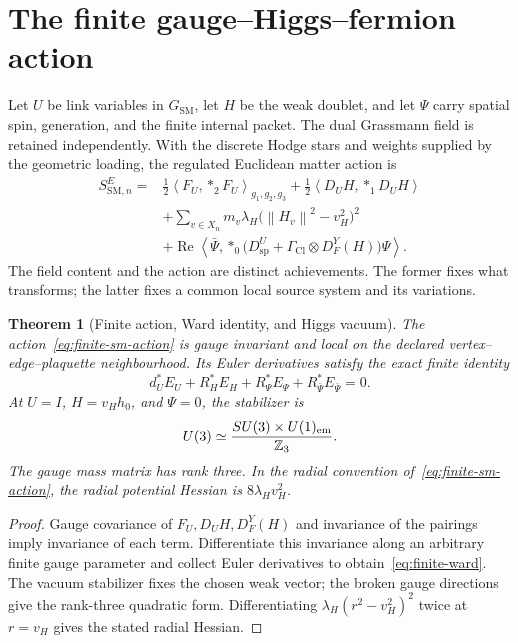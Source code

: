 \documentclass[11pt,a4paper,oneside]{book}
\theoremstyle{plain}
\newtheorem{theorem}{Theorem}[chapter]
\theoremstyle{definition}
\theoremstyle{remark}
\newcommand{\Z}{\mathbb Z}
\newcommand{\GSM}{G_{\mathrm{SM}}}
\newcommand{\norm}[1]{\left\lVert#1\right\rVert}
\newcommand{\pair}[2]{\left\langle#1,#2\right\rangle}
\newcommand{\src}[2]{\cite{#1}}
\begin{document}
\section{The finite gauge--Higgs--fermion action}
Let $U$ be link variables in $\GSM$, let $H$ be the weak doublet, and let $\Psi$ carry spatial spin, generation, and the finite internal packet. The dual Grassmann field is retained independently. With the discrete Hodge stars and weights supplied by the geometric loading, the regulated Euclidean matter action is
\begin{equation}
\begin{aligned}
 S_{\mathrm{SM},n}^{E}={}&
 \frac12\pair{F_U}{*_2F_U}_{g_1,g_2,g_3}
 +\frac12\pair{D_UH}{*_1D_UH}\\
 &+\sum_{v\in X_n}m_v\lambda_H\bigl(\norm{H_v}^2-v_H^2\bigr)^2\\
 &+\operatorname{Re}\pair{\bar\Psi}
 {*_0\bigl(D_{\mathrm{sp}}^U+\Gamma_{\mathrm{Cl}}\otimes D_F^Y(H)\bigr)\Psi}.
 \label{eq:finite-sm-action}
\end{aligned}
\end{equation}
The field content and the action are distinct achievements. The former fixes what transforms; the latter fixes a common local source system and its variations.

\begin{theorem}[Finite action, Ward identity, and Higgs vacuum]
\label{thm:action}
The action~\eqref{eq:finite-sm-action} is gauge invariant and local on the declared vertex--edge--plaquette neighbourhood. Its Euler derivatives satisfy the exact finite identity
\begin{equation}
 d_U^*E_U+R_H^*E_H+R_\Psi^*E_\Psi+R_{\bar\Psi}^*E_{\bar\Psi}=0.
 \label{eq:finite-ward}
\end{equation}
At $U=I$, $H=v_Hh_0$, and $\Psi=0$, the stabilizer is
\begin{equation}
 U(3)\simeq\frac{SU(3)\times U(1)_{\rm em}}{\Z_3}.
\end{equation}
The gauge mass matrix has rank three. In the radial convention of~\eqref{eq:finite-sm-action}, the radial potential Hessian is $8\lambda_Hv_H^2$.
\end{theorem}
\begin{proof}
Gauge covariance of $F_U,D_UH,D_F^Y(H)$ and invariance of the pairings imply invariance of each term. Differentiate this invariance along an arbitrary finite gauge parameter and collect Euler derivatives to obtain~\eqref{eq:finite-ward}. The vacuum stabilizer fixes the chosen weak vector; the broken gauge directions give the rank-three quadratic form. Differentiating $\lambda_H(r^2-v_H^2)^2$ twice at $r=v_H$ gives the stated radial Hessian.
\end{proof}
\src{GT}{thm:SM-active-SM-II}
\end{document}
